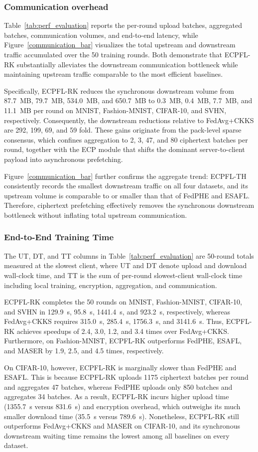 \subsubsection{Communication overhead}
Table~\ref{tab:perf_evaluation} reports the per-round upload batches, aggregated batches, communication volumes, and end-to-end latency, while Figure~\ref{communication_bar} visualizes the total upstream and downstream traffic accumulated over the 50 training rounds. Both demonstrate that ECPFL-RK substantially alleviates the downstream communication bottleneck while maintaining upstream traffic comparable to the most efficient baselines.

Specifically, ECPFL-RK reduces the synchronous downstream volume from 87.7~MB, 79.7~MB, 534.0~MB, and 650.7~MB to 0.3~MB, 0.4~MB, 7.7~MB, and 11.1~MB per round on MNIST, Fashion-MNIST, CIFAR-10, and SVHN, respectively. Consequently, the downstream reductions relative to FedAvg+CKKS are 292, 199, 69, and 59 fold. These gains originate from the pack-level sparse consensus, which confines aggregation to 2, 3, 47, and 80 ciphertext batches per round, together with the ECP module that shifts the dominant server-to-client payload into asynchronous prefetching.

Figure~\ref{communication_bar} further confirms the aggregate trend: ECPFL-TH consistently records the smallest downstream traffic on all four datasets, and its upstream volume is comparable to or smaller than that of FedPHE and ESAFL. Therefore, ciphertext prefetching effectively removes the synchronous downstream bottleneck without inflating total upstream communication.

\subsubsection{End-to-End Training Time}
The UT, DT, and TT columns in Table~\ref{tab:perf_evaluation} are 50-round totals measured at the slowest client, where UT and DT denote upload and download wall-clock time, and TT is the sum of per-round slowest-client wall-clock time including local training, encryption, aggregation, and communication.

ECPFL-RK completes the 50 rounds on MNIST, Fashion-MNIST, CIFAR-10, and SVHN in 129.9~s, 95.8~s, 1441.4~s, and 923.2~s, respectively, whereas FedAvg+CKKS requires 315.0~s, 285.4~s, 1756.3~s, and 3141.6~s. Thus, ECPFL-RK achieves speedups of 2.4, 3.0, 1.2, and 3.4 times over FedAvg+CKKS. Furthermore, on Fashion-MNIST, ECPFL-RK outperforms FedPHE, ESAFL, and MASER by 1.9, 2.5, and 4.5 times, respectively.

On CIFAR-10, however, ECPFL-RK is marginally slower than FedPHE and ESAFL. This is because ECPFL-RK uploads 1175 ciphertext batches per round and aggregates 47 batches, whereas FedPHE uploads only 850 batches and aggregates 34 batches. As a result, ECPFL-RK incurs higher upload time (1355.7~s versus 831.6~s) and encryption overhead, which outweighs its much smaller download time (35.5~s versus 789.6~s). Nonetheless, ECPFL-RK still outperforms FedAvg+CKKS and MASER on CIFAR-10, and its synchronous downstream waiting time remains the lowest among all baselines on every dataset.
